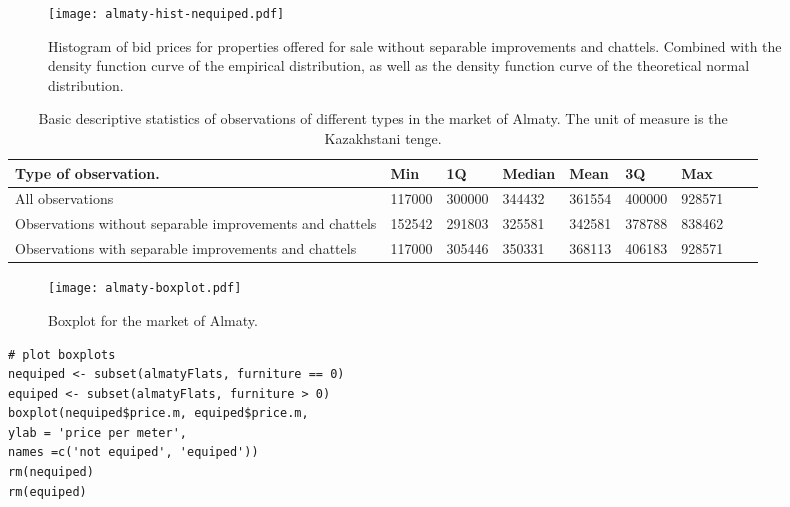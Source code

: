 \documentclass[]{scrreprt}
\begin{document}
%
%
\begin{figure}[htp]
	\centering
	\texttt{[image: almaty-hist-nequiped.pdf]}
	\caption{Histogram of bid prices for properties offered for sale without separable improvements and chattels. Combined with the density function curve of the empirical distribution, as well as the density function curve of the theoretical normal distribution.}
	\label{fig:almaty-hist-nequiped-r}
\end{figure}
%
\begin{table}[htp]
	\caption{Basic descriptive statistics of observations of different types in the market of Almaty. The unit of measure is the Kazakhstani tenge.}\label{tab:summaries-almaty-R}
	\centering
	\begin{tabular}{lllllllll}
		\hline
		Type of observation.&Min&1Q&Median&Mean&3Q&Max\\
		\hline
		All observations&117000&300000&344432&361554&400000&928571\\
		\hline
		Observations without separable improvements and chattels&152542&291803&325581&342581&378788&838462\\
		\hline
		Observations with separable improvements and chattels&117000&305446&350331&368113&406183&928571\\
		\hline
	\end{tabular}
\end{table}
%
\begin{figure}[htp]
	\centering
	\texttt{[image: almaty-boxplot.pdf]}
	\caption{Boxplot for the market of Almaty.}
	\label{fig:almaty-boxplot-r}
\end{figure}
%
\begin{lstlisting}[float=htp, caption = Plotting boxplot diagram for the market of Almaty, firstnumber=1, label= lst:boxplot-R]
# plot boxplots
nequiped <- subset(almatyFlats, furniture == 0)
equiped <- subset(almatyFlats, furniture > 0)
boxplot(nequiped$price.m, equiped$price.m,
ylab = 'price per meter',
names =c('not equiped', 'equiped'))
rm(nequiped)
rm(equiped)
\end{lstlisting}
%
\end{document}
